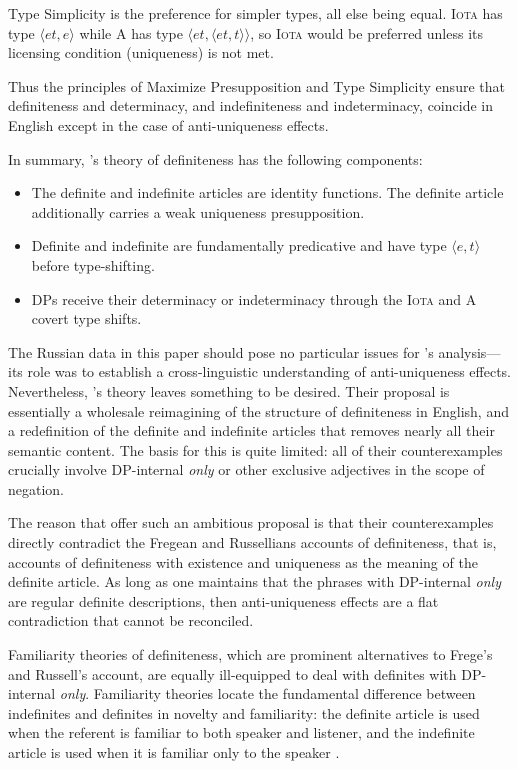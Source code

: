 Type Simplicity is the preference for simpler types, all else being equal. \textsc{Iota} has type $\langle et, e \rangle$ while \textsc{A} has type $\langle et, \langle et, t \rangle \rangle$, so \textsc{Iota} would be preferred unless its licensing condition (uniqueness) is not met.

Thus the principles of Maximize Presupposition and Type Simplicity ensure that definiteness and determinacy, and indefiniteness and indeterminacy, coincide in English except in the case of anti-uniqueness effects.

In summary, \citeauthor{cb2015}'s theory of definiteness has the following components:

\begin{itemize}
	\item The definite and indefinite articles are identity functions. The definite article additionally carries a weak uniqueness presupposition.
	\item Definite and indefinite are fundamentally predicative and have type $\langle e, t \rangle$ before type-shifting.
	\item DPs receive their determinacy or indeterminacy through the \textsc{Iota} and \textsc{A} covert type shifts.
\end{itemize}

The Russian data in this paper should pose no particular issues for \citeauthor{cb2015}'s analysis---its role was to establish a cross-linguistic understanding of anti-uniqueness effects. Nevertheless, \citeauthor{cb2015}'s theory leaves something to be desired. Their proposal is essentially a wholesale reimagining of the structure of definiteness in English, and a redefinition of the definite and indefinite articles that removes nearly all their semantic content. The basis for this is quite limited: all of their counterexamples crucially involve DP-internal \textit{only} or other exclusive adjectives in the scope of negation.

The reason that \citeauthor{cb2015} offer such an ambitious proposal is that their counterexamples directly contradict the Fregean and Russellians accounts of definiteness, that is, accounts of definiteness with existence and uniqueness as the meaning of the definite article. As long as one maintains that the phrases with DP-internal \textit{only} are regular definite descriptions, then anti-uniqueness effects are a flat contradiction that cannot be reconciled.

Familiarity theories of definiteness, which are prominent alternatives to Frege's and Russell's account, are equally ill-equipped to deal with definites with DP-internal \textit{only}. Familiarity theories locate the fundamental difference between indefinites and definites in novelty and familiarity: the definite article is used when the referent is familiar to both speaker and listener, and the indefinite article is used when it is familiar only to the speaker \citep{heim82}.

